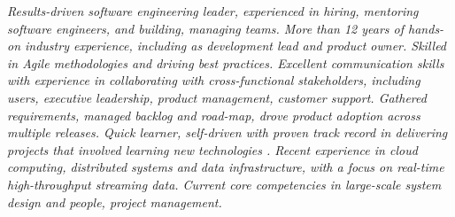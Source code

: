 {\selectfont
	\begin{justify}\textit{Results-driven software engineering leader, experienced in hiring, mentoring software engineers, and building, managing teams. More than 12 years of hands-on industry experience, including as development lead and product owner. Skilled in Agile methodologies and driving best practices. Excellent communication skills with experience in collaborating with cross-functional stakeholders, including users, executive leadership, product management, customer support. Gathered requirements, managed backlog and road-map, drove product adoption across multiple releases. Quick learner, self-driven with proven track record in delivering projects that involved learning new technologies . Recent experience in cloud computing, distributed systems and data infrastructure, with a focus on real-time high-throughput streaming data. Current core competencies in large-scale system design and people, project management.}\end{justify}
}